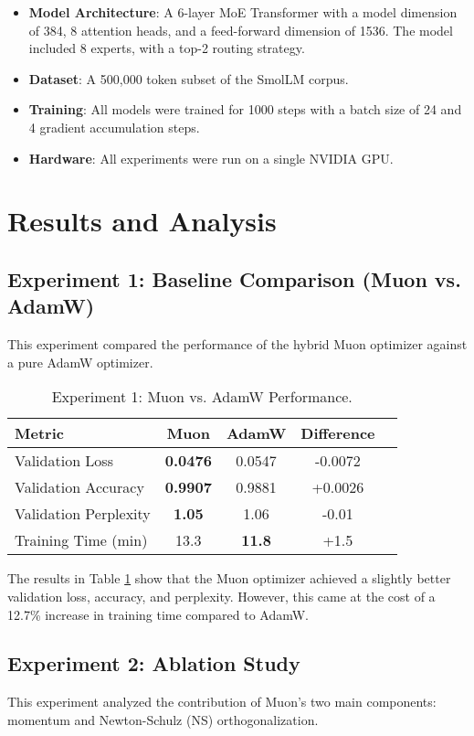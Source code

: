 \documentclass[11pt, a4paper]{article}
\begin{document}
\begin{itemize}
    \item \textbf{Model Architecture}: A 6-layer MoE Transformer with a model dimension of 384, 8 attention heads, and a feed-forward dimension of 1536. The model included 8 experts, with a top-2 routing strategy.
    \item \textbf{Dataset}: A 500,000 token subset of the SmolLM corpus.
    \item \textbf{Training}: All models were trained for 1000 steps with a batch size of 24 and 4 gradient accumulation steps.
    \item \textbf{Hardware}: All experiments were run on a single NVIDIA GPU.
\end{itemize}

\section{Results and Analysis}

\subsection{Experiment 1: Baseline Comparison (Muon vs. AdamW)}
This experiment compared the performance of the hybrid Muon optimizer against a pure AdamW optimizer.

\begin{table}[h!]
\centering
\caption{Experiment 1: Muon vs. AdamW Performance.}
\label{tab:exp1}
\begin{tabular}{@{}lcccc@{}}
\toprule
Metric & Muon & AdamW & Difference \\ \midrule
Validation Loss & \textbf{0.0476} & 0.0547 & -0.0072 \\
Validation Accuracy & \textbf{0.9907} & 0.9881 & +0.0026 \\
Validation Perplexity & \textbf{1.05} & 1.06 & -0.01 \\
Training Time (min) & 13.3 & \textbf{11.8} & +1.5 \\ \bottomrule
\end{tabular}
\end{table}

The results in Table \ref{tab:exp1} show that the Muon optimizer achieved a slightly better validation loss, accuracy, and perplexity. However, this came at the cost of a 12.7\% increase in training time compared to AdamW.

\subsection{Experiment 2: Ablation Study}
This experiment analyzed the contribution of Muon's two main components: momentum and Newton-Schulz (NS) orthogonalization.
\end{document}
